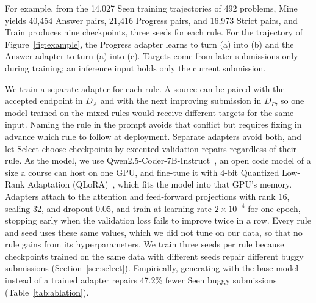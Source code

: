 \documentclass[10pt,conference]{IEEEtran}
\begin{document}
For example, from the 14,027 Seen training trajectories of 492 problems, Mine yields 40,454 Answer pairs, 21,416 Progress pairs, and 16,973 Strict pairs, and Train produces nine checkpoints, three seeds for each rule. For the trajectory of Figure~\ref{fig:example}, the Progress adapter learns to turn (a) into (b) and the Answer adapter to turn (a) into (c). Targets come from later submissions only during training; an inference input holds only the current submission.

We train a separate adapter for each rule. A source can be paired with the accepted endpoint in \(D_A\) and with the next improving submission in \(D_P\), so one model trained on the mixed rules would receive different targets for the same input. Naming the rule in the prompt avoids that conflict but requires fixing in advance which rule to follow at deployment. Separate adapters avoid both, and let Select choose checkpoints by executed validation repairs regardless of their rule. As the model, we use Qwen2.5-Coder-7B-Instruct~\cite{hui2024qwen2}, an open code model of a size a course can host on one GPU, and fine-tune it with 4-bit Quantized Low-Rank Adaptation (QLoRA)~\cite{dettmers2023qlora}, which fits the model into that GPU's memory. Adapters attach to the attention and feed-forward projections with rank 16, scaling 32, and dropout 0.05, and train at learning rate \(2\times10^{-4}\) for one epoch, stopping early when the validation loss fails to improve twice in a row. Every rule and seed uses these same values, which we did not tune on our data, so that no rule gains from its hyperparameters. We train three seeds per rule because checkpoints trained on the same data with different seeds repair different buggy submissions (Section~\ref{sec:select}). Empirically, generating with the base model instead of a trained adapter repairs 47.2\% fewer Seen buggy submissions (Table~\ref{tab:ablation}).
\end{document}
